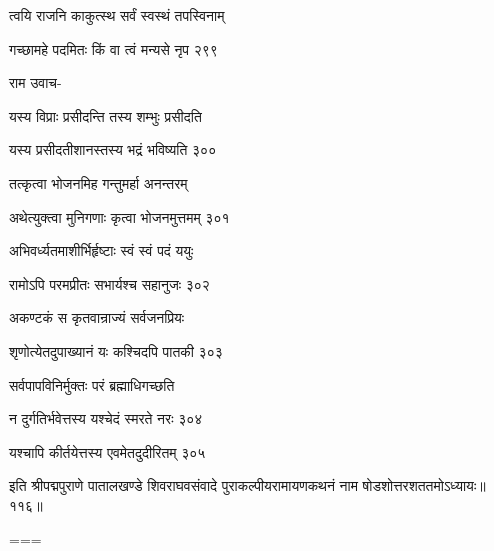 त्वयि राजनि काकुत्स्थ सर्वं स्वस्थं तपस्विनाम्

गच्छामहे पदमितः किं वा त्वं मन्यसे नृप २९९

राम उवाच-

यस्य विप्राः प्रसीदन्ति तस्य शम्भुः प्रसीदति

यस्य प्रसीदतीशानस्तस्य भद्रं भविष्यति ३००

तत्कृत्वा भोजनमिह गन्तुमर्हा अनन्तरम्

अथेत्युक्त्वा मुनिगणाः कृत्वा भोजनमुत्तमम् ३०१

अभिवर्ध्यतमाशीर्भिर्हृष्टाः स्वं स्वं पदं ययुः

रामोऽपि परमप्रीतः सभार्यश्च सहानुजः ३०२

अकण्टकं स कृतवान्राज्यं सर्वजनप्रियः

शृणोत्येतदुपाख्यानं यः कश्चिदपि पातकी ३०३

सर्वपापविनिर्मुक्तः परं ब्रह्माधिगच्छति

न दुर्गतिर्भवेत्तस्य यश्चेदं स्मरते नरः ३०४

यश्चापि कीर्तयेत्तस्य एवमेतदुदीरितम् ३०५

इति श्रीपद्मपुराणे पातालखण्डे शिवराघवसंवादे पुराकल्पीयरामायणकथनं नाम षोडशोत्तरशततमोऽध्यायः॥११६॥


===
